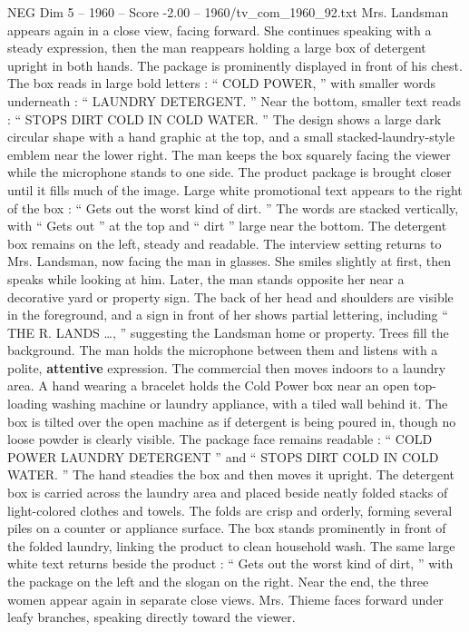 \begin{textsample}{NEG Dim 5 – 1960 – Score -2.00 – 1960/tv\_com\_1960\_92.txt}
Mrs.
Landsman appears again in a close view, facing forward.
She continues speaking with a steady expression, then the man reappears holding a large box of detergent upright in both hands.
The package is prominently displayed in front of his chest.
The box reads in large bold letters : “ COLD POWER, ” with smaller words underneath : “ LAUNDRY DETERGENT. ” Near the bottom, smaller text reads : “ STOPS DIRT COLD IN COLD WATER. ” The design shows a large dark circular shape with a hand graphic at the top, and a small stacked-laundry-style emblem near the lower right.
The man keeps the box squarely facing the viewer while the microphone stands to one side.
The product package is brought closer until it fills much of the image.
Large white promotional text appears to the right of the box : “ Gets out the worst kind of dirt. ” The words are stacked vertically, with “ Gets out ” at the top and “ dirt ” large near the bottom.
The detergent box remains on the left, steady and readable.
The interview setting returns to Mrs.
Landsman, now facing the man in glasses.
She smiles slightly at first, then speaks while looking at him.
Later, the man stands opposite her near a decorative yard or property sign.
The back of her head and shoulders are visible in the foreground, and a sign in front of her shows partial lettering, including “ THE R.
LANDS …, ” suggesting the Landsman home or property.
Trees fill the background.
The man holds the microphone between them and listens with a polite, \textbf{attentive} expression.
The commercial then moves indoors to a laundry area.
A hand wearing a bracelet holds the Cold Power box near an open top-loading washing machine or laundry appliance, with a tiled wall behind it.
The box is tilted over the open machine as if detergent is being poured in, though no loose powder is clearly visible.
The package face remains readable : “ COLD POWER LAUNDRY DETERGENT ” and “ STOPS DIRT COLD IN COLD WATER. ” The hand steadies the box and then moves it upright.
The detergent box is carried across the laundry area and placed beside neatly folded stacks of light-colored clothes and towels.
The folds are crisp and orderly, forming several piles on a counter or appliance surface.
The box stands prominently in front of the folded laundry, linking the product to clean household wash.
The same large white text returns beside the product : “ Gets out the worst kind of dirt, ” with the package on the left and the slogan on the right.
Near the end, the three women appear again in separate close views.
Mrs.
Thieme faces forward under leafy branches, speaking directly toward the viewer.

\end{textsample}
